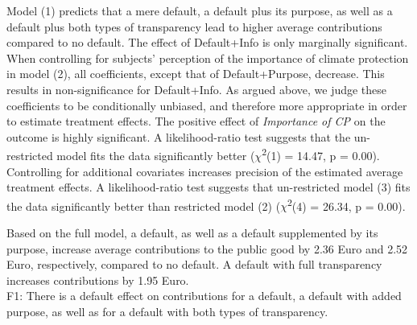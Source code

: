 \documentclass[review, authoryear,12pt]{elsarticle}
\begin{document}
Model (1) predicts that a mere default, a default plus its purpose, as well as a default plus both types of transparency lead to higher average contributions compared to no default. The effect of Default+Info is only marginally significant. When controlling for subjects' perception of the importance of climate protection in model (2), all coefficients, except that of Default+Purpose, decrease. This results in non-significance for Default+Info. As argued above, we judge these coefficients to be conditionally unbiased, and therefore more appropriate in order to estimate treatment effects. The positive effect of \textit{Importance of CP} on the outcome is highly significant. A likelihood-ratio test suggests that the un-restricted model fits the data significantly better ($\chi$\textsuperscript{2}(1) = 14.47, p = 0.00). Controlling for additional covariates increases precision of the estimated average treatment effects. A likelihood-ratio test suggests that un-restricted model (3) fits the data significantly better than restricted model (2) ($\chi$\textsuperscript{2}(4) = 26.34, p = 0.00).

Based on the full model, a default, as well as a default supplemented by its purpose, increase average contributions to the public good by 2.36 Euro and 2.52 Euro, respectively, compared to no default. A default with full transparency increases contributions by 1.95 Euro. \\

F1: There is a default effect on contributions for a default, a default with added purpose, as well as for a default with both types of transparency. \\
\end{document}
